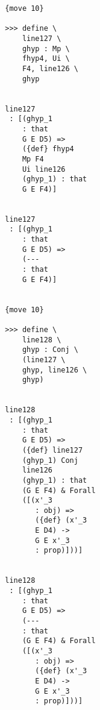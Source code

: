 \documentclass[12pt]{article}
\begin{document}
\begin{verbatim}
                                 {move 10}

                                 >>> define \
                                     line127 \
                                     ghyp : Mp \
                                     fhyp4, Ui \
                                     F4, line126 \
                                     ghyp


                                 line127 
                                  : [(ghyp_1 
                                     : that 
                                     G E D5) => 
                                     ({def} fhyp4 
                                     Mp F4 
                                     Ui line126 
                                     (ghyp_1) : that 
                                     G E F4)]


                                 line127 
                                  : [(ghyp_1 
                                     : that 
                                     G E D5) => 
                                     (--- 
                                     : that 
                                     G E F4)]


                                 {move 10}

                                 >>> define \
                                     line128 \
                                     ghyp : Conj \
                                     (line127 \
                                     ghyp, line126 \
                                     ghyp)


                                 line128 
                                  : [(ghyp_1 
                                     : that 
                                     G E D5) => 
                                     ({def} line127 
                                     (ghyp_1) Conj 
                                     line126 
                                     (ghyp_1) : that 
                                     (G E F4) & Forall 
                                     ([(x'_3 
                                        : obj) => 
                                        ({def} (x'_3 
                                        E D4) -> 
                                        G E x'_3 
                                        : prop)]))]


                                 line128 
                                  : [(ghyp_1 
                                     : that 
                                     G E D5) => 
                                     (--- 
                                     : that 
                                     (G E F4) & Forall 
                                     ([(x'_3 
                                        : obj) => 
                                        ({def} (x'_3 
                                        E D4) -> 
                                        G E x'_3 
                                        : prop)]))]



\end{verbatim}
\end{document}
